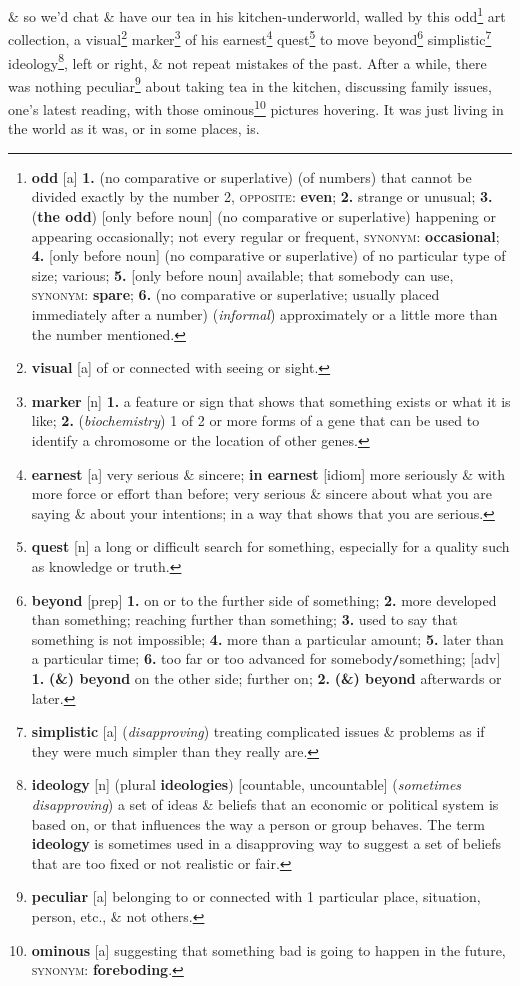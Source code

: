 \documentclass[oneside]{book}
\numberwithin{equation}{section}
\begin{document}
\& so we'd chat \& have our tea in his kitchen-underworld, walled by this odd\footnote{\textbf{odd} [a] \textbf{1.} (no comparative or superlative) (of numbers) that cannot be divided exactly by the number 2, \textsc{opposite}: \textbf{even}; \textbf{2.} strange or unusual; \textbf{3.} (\textbf{the odd}) [only before noun] (no comparative or superlative) happening or appearing occasionally; not every regular or frequent, \textsc{synonym}: \textbf{occasional}; \textbf{4.} [only before noun] (no comparative or superlative) of no particular type of size; various; \textbf{5.} [only before noun] available; that somebody can use, \textsc{synonym}: \textbf{spare}; \textbf{6.} (no comparative or superlative; usually placed immediately after a number) (\textit{informal}) approximately or a little more than the number mentioned.} art collection, a visual\footnote{\textbf{visual} [a] of or connected with seeing or sight.} marker\footnote{\textbf{marker} [n] \textbf{1.} a feature or sign that shows that something exists or what it is like; \textbf{2.} (\textit{biochemistry}) 1 of 2 or more forms of a gene that can be used to identify a chromosome or the location of other genes.} of his earnest\footnote{\textbf{earnest} [a] very serious \& sincere; \textbf{in earnest} [idiom] more seriously \& with more force or effort than before; very serious \& sincere about what you are saying \& about your intentions; in a way that shows that you are serious.} quest\footnote{\textbf{quest} [n] a long or difficult search for something, especially for a quality such as knowledge or truth.} to move beyond\footnote{\textbf{beyond} [prep] \textbf{1.} on or to the further side of something; \textbf{2.} more developed than something; reaching further than something; \textbf{3.} used to say that something is not impossible; \textbf{4.} more than a particular amount; \textbf{5.} later than a particular time; \textbf{6.} too far or too advanced for somebody\texttt{/}something; [adv] \textbf{1.} \textbf{(\&) beyond} on the other side; further on; \textbf{2.} \textbf{(\&) beyond} afterwards or later.} simplistic\footnote{\textbf{simplistic} [a] (\textit{disapproving}) treating complicated issues \& problems as if they were much simpler than they really are.} ideology\footnote{\textbf{ideology} [n] (plural \textbf{ideologies}) [countable, uncountable] (\textit{sometimes disapproving}) a set of ideas \& beliefs that an economic or political system is based on, or that influences the way a person or group behaves. The term \textbf{ideology} is sometimes used in a disapproving way to suggest a set of beliefs that are too fixed or not realistic or fair.}, left or right, \& not repeat mistakes of the past. After a while, there was nothing peculiar\footnote{\textbf{peculiar} [a] belonging to or connected with 1 particular place, situation, person, etc., \& not others.} about taking tea in the kitchen, discussing family issues, one's latest reading, with those ominous\footnote{\textbf{ominous} [a] suggesting that something bad is going to happen in the future, \textsc{synonym}: \textbf{foreboding}.} pictures hovering. It was just living in the world as it was, or in some places, is.
\end{document}
